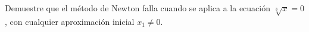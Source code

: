 \item Demuestre que el método de Newton falla cuando se aplica a la ecuación $\sqrt[3]{x} = 0$, con cualquier aproximación inicial $x_1 \ne 0$.

